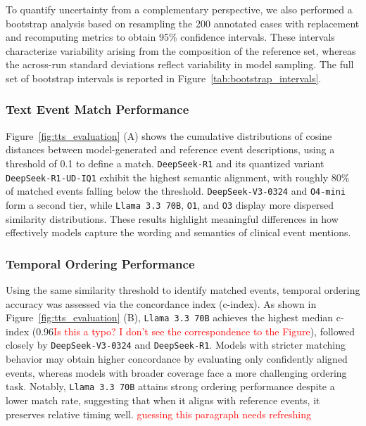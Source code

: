 \documentclass[pdflatex,sn-mathphys-num]{sn-jnl}%
\newcommand{\jeremy}[1]{\textcolor{red}{#1}}
\theoremstyle{thmstyleone}%
\theoremstyle{thmstyletwo}%
\theoremstyle{thmstylethree}%
\begin{document}
To quantify uncertainty from a complementary perspective, we also performed a bootstrap analysis based on resampling the 200 annotated cases with replacement and recomputing metrics to obtain 95\% confidence intervals. These intervals characterize variability arising from the composition of the reference set, whereas the across-run standard deviations reflect variability in model sampling. The full set of bootstrap intervals is reported in Figure~\ref{tab:bootstrap_intervals}.




\subsubsection{Text Event Match Performance}
\label{sec:text-event-match-performance}
Figure~\ref{fig:tts_evaluation} (A) shows the cumulative distributions of cosine distances between model-generated and reference event descriptions, using a threshold of 0.1 to define a match. \texttt{DeepSeek-R1} and its quantized variant \texttt{DeepSeek-R1-UD-IQ1} exhibit the highest semantic alignment, with roughly 80\% of matched events falling below the threshold. \texttt{DeepSeek-V3-0324} and \texttt{O4-mini} form a second tier, while \texttt{Llama 3.3 70B}, \texttt{O1}, and \texttt{O3} display more dispersed similarity distributions. These results highlight meaningful differences in how effectively models capture the wording and semantics of clinical event mentions.

\subsubsection{Temporal Ordering Performance}
\label{sec:temporal-ordering-performance}
Using the same similarity threshold to identify matched events, temporal ordering accuracy was assessed via the concordance index (c-index). As shown in Figure~\ref{fig:tts_evaluation} (B), \texttt{Llama 3.3 70B} achieves the highest median c-index (0.96\jeremy{Is this a typo? I don't see the correspondence to the Figure}), followed closely by \texttt{DeepSeek-V3-0324} and \texttt{DeepSeek-R1}. Models with stricter matching behavior may obtain higher concordance by evaluating only confidently aligned events, whereas models with broader coverage face a more challenging ordering task. Notably, \texttt{Llama 3.3 70B} attains strong ordering performance despite a lower match rate, suggesting that when it aligns with reference events, it preserves relative timing well. \jeremy{guessing this paragraph needs refreshing}
\end{document}
